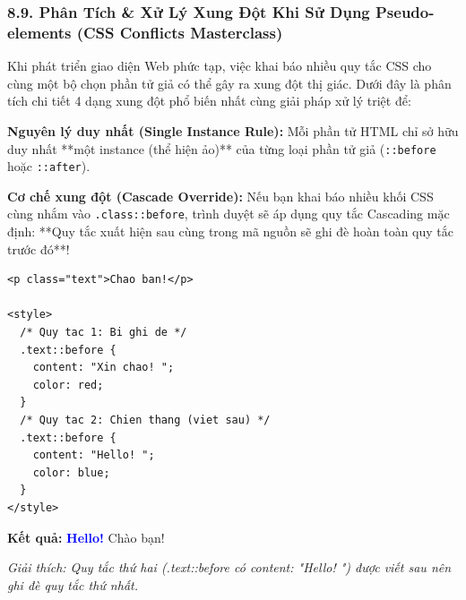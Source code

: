 \documentclass[11pt,oneside]{book}
\newcommand{\codeinline}[1]{\textcolor{accentOrange}{\texttt{#1}}}
\begin{document}
\subsubsection{8.9. Phân Tích \& Xử Lý Xung Đột Khi Sử Dụng Pseudo-elements (CSS Conflicts Masterclass)}

Khi phát triển giao diện Web phức tạp, việc khai báo nhiều quy tắc CSS cho cùng một bộ chọn phần tử giả có thể gây ra xung đột thị giác. Dưới đây là phân tích chi tiết 4 dạng xung đột phổ biến nhất cùng giải pháp xử lý triệt để:

\begin{conceptBox}
\textbf{Nguyên lý duy nhất (Single Instance Rule):} Mỗi phần tử HTML chỉ sở hữu duy nhất **một instance (thể hiện ảo)** của từng loại phần tử giả (\codeinline{::before} hoặc \codeinline{::after}).
\par\vspace{4pt}
\textbf{Cơ chế xung đột (Cascade Override):} Nếu bạn khai báo nhiều khối CSS cùng nhắm vào \codeinline{.class::before}, trình duyệt sẽ áp dụng quy tắc Cascading mặc định: **Quy tắc xuất hiện sau cùng trong mã nguồn sẽ ghi đè hoàn toàn quy tắc trước đó**!
\end{conceptBox}

\begin{codeWindow}
\begin{lstlisting}[language=HTML5]
<p class="text">Chao ban!</p>

<style>
  /* Quy tac 1: Bi ghi de */
  .text::before {
    content: "Xin chao! ";
    color: red;
  }
  /* Quy tac 2: Chien thang (viet sau) */
  .text::before {
    content: "Hello! ";
    color: blue;
  }
</style>
\end{lstlisting}
\end{codeWindow}

\begin{browserWindow}
\sffamily\small
\textbf{Kết quả:} \textcolor{blue}{\textbf{Hello! }}Chào bạn! \par\vspace{2pt}
{\scriptsize\textcolor{gray!70}{\textit{Giải thích: Quy tắc thứ hai (.text::before có content: "Hello! ") được viết sau nên ghi đè quy tắc thứ nhất.}}}
\end{browserWindow}
\end{document}
